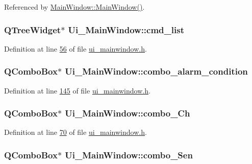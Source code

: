 Referenced by \hyperlink{a00109_source_l00024}{Main\+Window\+::\+Main\+Window()}.

\hypertarget{a00080_aa66ece71395b435e915d384fb63bac1d}{
\subsubsection[{cmd\+\_\+list}]{\setlength{\rightskip}{0pt plus 5cm}Q\+Tree\+Widget$\ast$ Ui\+\_\+\+Main\+Window\+::cmd\+\_\+list}}\label{a00080_aa66ece71395b435e915d384fb63bac1d}


Definition at line \hyperlink{a00139_source_l00056}{56} of file \hyperlink{a00139_source}{ui\+\_\+mainwindow.\+h}.

\hypertarget{a00080_a2af463e4a88fddd219f2e41a386fbd68}{
\subsubsection[{combo\+\_\+alarm\+\_\+condition}]{\setlength{\rightskip}{0pt plus 5cm}Q\+Combo\+Box$\ast$ Ui\+\_\+\+Main\+Window\+::combo\+\_\+alarm\+\_\+condition}}\label{a00080_a2af463e4a88fddd219f2e41a386fbd68}


Definition at line \hyperlink{a00139_source_l00145}{145} of file \hyperlink{a00139_source}{ui\+\_\+mainwindow.\+h}.

\hypertarget{a00080_a263fb43f2eff37a44ff7359ba41e2eeb}{
\subsubsection[{combo\+\_\+\+Ch}]{\setlength{\rightskip}{0pt plus 5cm}Q\+Combo\+Box$\ast$ Ui\+\_\+\+Main\+Window\+::combo\+\_\+\+Ch}}\label{a00080_a263fb43f2eff37a44ff7359ba41e2eeb}


Definition at line \hyperlink{a00139_source_l00070}{70} of file \hyperlink{a00139_source}{ui\+\_\+mainwindow.\+h}.

\hypertarget{a00080_ad95005b5fcac8126171019298147b285}{
\subsubsection[{combo\+\_\+\+Sen}]{\setlength{\rightskip}{0pt plus 5cm}Q\+Combo\+Box$\ast$ Ui\+\_\+\+Main\+Window\+::combo\+\_\+\+Sen}}\label{a00080_ad95005b5fcac8126171019298147b285}


